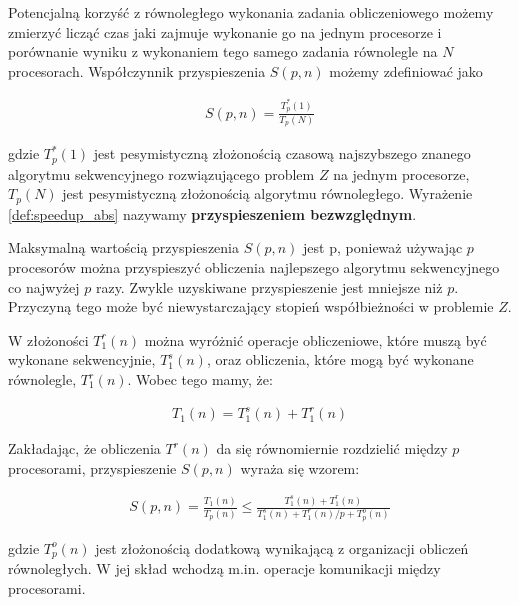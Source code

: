 Potencjalną korzyść z równoległego wykonania zadania obliczeniowego możemy zmierzyć licząć czas jaki zajmuje wykonanie go na jednym procesorze i porównanie wyniku z wykonaniem tego samego zadania równolegle na \(N\) procesorach. Współczynnik przyspieszenia \(S(p, n)\) możemy zdefiniować jako

\begin{align}\label{def:speedup_abs}
 S(p, n)=\frac{T^{*}_{p}(1)}{T_{p}(N)}
\end{align}

gdzie \(T^{*}_{p}(1)\) jest pesymistyczną złożonością czasową najszybszego znanego algorytmu sekwencyjnego rozwiązującego problem \(Z\) na jednym procesorze, \(T_{p}(N)\) jest pesymistyczną złożonością algorytmu równoległego. Wyrażenie \ref{def:speedup_abs} nazywamy \textbf{przyspieszeniem bezwzględnym}.

Maksymalną wartością przyspieszenia \(S(p,n)\) jest p, ponieważ używając \(p\) procesorów można przyspieszyć obliczenia najlepszego algorytmu sekwencyjnego co najwyżej \(p\) razy. Zwykle uzyskiwane przyspieszenie jest mniejsze niż \(p\). Przyczyną tego może być niewystarczający stopień współbieżności w problemie \(Z\). 



W złożoności \(T^{r}_{1}(n)\) można wyróżnić operacje obliczeniowe, które muszą być wykonane sekwencyjnie, \(T^{s}_{1}(n)\), oraz obliczenia, które mogą być wykonane równolegle, \(T^{r}_{1}(n)\). Wobec tego mamy, że:

\begin{align}
T_{1}(n) = T^{s}_{1}(n) + T^{r}_{1}(n)
\end{align}

Zakładając, że obliczenia \(T^{r}(n)\) da się równomiernie rozdzielić między \(p\) procesorami, przyspieszenie \(S(p, n)\) wyraża się wzorem:

\begin{align}\label{eq:supSpn}
S(p, n) = \frac{T_{1}(n)}{T_{p}(n)}\leq\frac{T^{s}_{1}(n) + T^{r}_{1}(n)}{T^{s}_{1}(n) + T^{r}_{1}(n)/p + T^{o}_{p}(n)}
\end{align}


gdzie \(T^{o}_{p}(n)\) jest złożonością dodatkową wynikającą z organizacji obliczeń równoległych. W jej skład wchodzą m.in. operacje komunikacji między procesorami.
